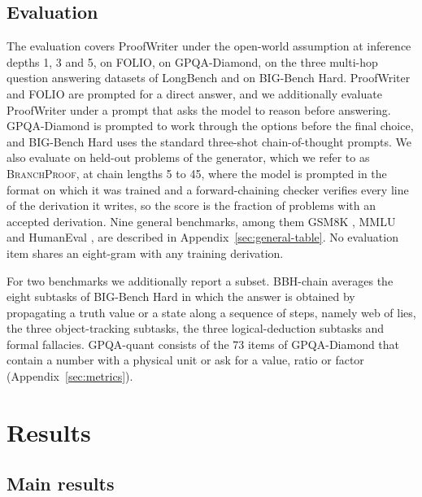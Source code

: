 \documentclass{article}
\newcommand{\branchproof}{\textsc{BranchProof}}
\begin{document}
\subsection{Evaluation}
\label{sec:eval}

The evaluation covers ProofWriter under the open-world assumption at
inference depths 1, 3 and 5, on FOLIO, on GPQA-Diamond, on the three multi-hop question
answering datasets of LongBench and on BIG-Bench Hard. ProofWriter and FOLIO are prompted for a direct answer, and we additionally
evaluate ProofWriter under a prompt that asks the model to reason before
answering. GPQA-Diamond is prompted to work through the options before the
final choice, and BIG-Bench Hard uses the standard three-shot
chain-of-thought prompts. We also evaluate on held-out problems of the
generator, which we refer to as \branchproof{}, at chain lengths 5 to 45,
where the model is prompted in the format on which it was trained and a
forward-chaining checker verifies every line of the derivation it writes, so
the score is the fraction of problems with an accepted derivation. Nine
general benchmarks, among them GSM8K \citep{cobbe2021training}, MMLU and
HumanEval \citep{chen2021evaluating}, are described in
Appendix~\ref{sec:general-table}. No evaluation item shares an eight-gram
with any training derivation.

For two benchmarks we additionally report a subset. BBH-chain averages the
eight subtasks of BIG-Bench Hard in which the answer is obtained by propagating a
truth value or a state along a sequence of steps, namely web of lies, the
three object-tracking subtasks, the three logical-deduction subtasks and
formal fallacies. GPQA-quant consists of the 73 items of GPQA-Diamond
that contain a number with a physical unit or ask for a value, ratio or
factor (Appendix~\ref{sec:metrics}).

\section{Results}
\label{sec:results}

\subsection{Main results}
\end{document}
